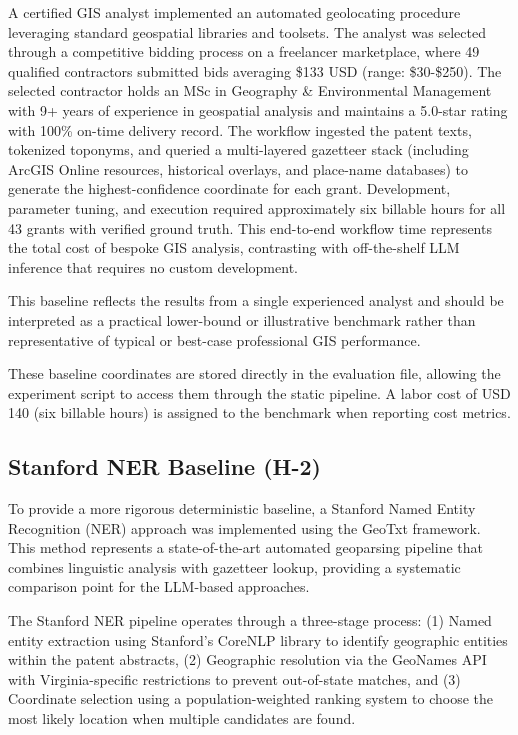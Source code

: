 A certified GIS analyst \citep{Bashorun2025_gis} implemented an
automated geolocating procedure leveraging standard geospatial libraries
and toolsets. The analyst was selected through a competitive bidding
process on a freelancer marketplace, where 49 qualified contractors
submitted bids averaging \$133 USD (range: \$30-\$250). The selected
contractor holds an MSc in Geography \& Environmental Management with 9+
years of experience in geospatial analysis and maintains a 5.0-star
rating with 100\% on-time delivery record. The workflow ingested the
patent texts, tokenized toponyms, and queried a multi-layered gazetteer
stack (including ArcGIS Online resources, historical overlays, and
place-name databases) to generate the highest-confidence coordinate for
each grant. Development, parameter tuning, and execution required
approximately six billable hours for all 43 grants with verified ground
truth. This end-to-end workflow time represents the total cost of
bespoke GIS analysis, contrasting with off-the-shelf LLM inference that
requires no custom development.

This baseline reflects the results from a single experienced analyst and
should be interpreted as a practical lower-bound or illustrative
benchmark rather than representative of typical or best-case
professional GIS performance.

These baseline coordinates are stored directly in the evaluation file,
allowing the experiment script to access them through the static
pipeline. A labor cost of USD 140 (six billable hours) is assigned to
the benchmark when reporting cost metrics.

\subsection{Stanford NER Baseline
(H-2)}\label{stanford-ner-baseline-h-2}

To provide a more rigorous deterministic baseline, a Stanford Named
Entity Recognition (NER) approach was implemented using the GeoTxt
framework. This method represents a state-of-the-art automated
geoparsing pipeline that combines linguistic analysis with gazetteer
lookup, providing a systematic comparison point for the LLM-based
approaches.

The Stanford NER pipeline operates through a three-stage process: (1)
Named entity extraction using Stanford's CoreNLP library to identify
geographic entities within the patent abstracts, (2) Geographic
resolution via the GeoNames API with Virginia-specific restrictions to
prevent out-of-state matches, and (3) Coordinate selection using a
population-weighted ranking system to choose the most likely location
when multiple candidates are found.

